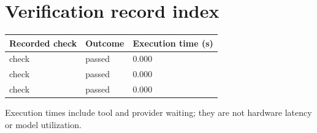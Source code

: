 \documentclass[11pt,a4paper]{article}
\begin{document}
\section{Verification record index}

{\small\renewcommand{\arraystretch}{1.18}\begin{longtable}{@{}L{0.57\textwidth}|L{0.16\textwidth}|L{0.17\textwidth}@{}}\toprule

\textbf{Recorded check} & \textbf{Outcome} & \textbf{Execution time (\allowbreak{}s)\allowbreak{}}\\\midrule\endhead

check & passed & 0.000\\[2pt]\hline

check & passed & 0.000\\[2pt]\hline

check & passed & 0.000\\[2pt]\hline

\bottomrule\end{longtable}}

Execution times include tool and provider waiting; they are not hardware latency or model utilization.
\end{document}
